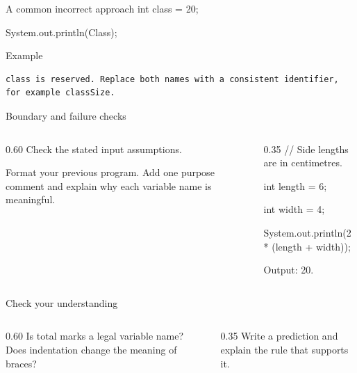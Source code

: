 \documentclass[10pt,aspectratio=169]{beamer}
\begin{document}
\begin{frame}[fragile,t]{A common incorrect approach}
int class = 20;\par System.out.println(Class);
\vspace{1mm}\begin{block}{Example}
\begin{lstlisting}
class is reserved. Replace both names with a consistent identifier, for example classSize.
\end{lstlisting}
\end{block}
\end{frame}

\begin{frame}[fragile,t]{Boundary and failure checks}
\begin{columns}[T,onlytextwidth]\begin{column}{0.60\textwidth}
Check the stated input assumptions.

Format your previous program. Add one purpose comment and explain why each variable name is meaningful.
\end{column}\begin{column}{0.35\textwidth}\small
// Side lengths are in centimetres.\par int length = 6;\par int width = 4;\par System.out.println(2 * (length + width));\par Output: 20.
\end{column}\end{columns}
\end{frame}

\begin{frame}[fragile,t]{Check your understanding}
\begin{columns}[T,onlytextwidth]\begin{column}{0.60\textwidth}
Is total marks a legal variable name? Does indentation change the meaning of braces?
\end{column}\begin{column}{0.35\textwidth}\small
Write a prediction and explain the rule that supports it.
\end{column}\end{columns}
\end{frame}
\end{document}
